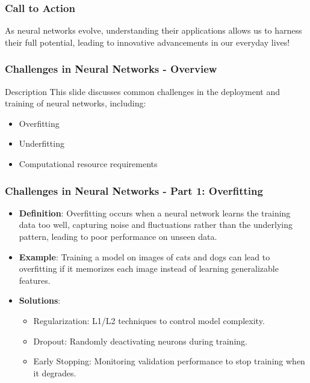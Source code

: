 \documentclass[aspectratio=169]{beamer}
\begin{document}
\begin{frame}[fragile]
    \frametitle{Call to Action}
    As neural networks evolve, understanding their applications allows us to harness their full potential, leading to innovative advancements in our everyday lives!
\end{frame}

\begin{frame}[fragile]
  \frametitle{Challenges in Neural Networks - Overview}
  
  \begin{block}{Description}
    This slide discusses common challenges in the deployment and training of neural networks, including:
    \begin{itemize}
      \item Overfitting
      \item Underfitting
      \item Computational resource requirements
    \end{itemize}
  \end{block}
\end{frame}

\begin{frame}[fragile]
  \frametitle{Challenges in Neural Networks - Part 1: Overfitting}

  \begin{itemize}
    \item \textbf{Definition}: 
      Overfitting occurs when a neural network learns the training data too well, capturing noise and fluctuations rather than the underlying pattern, leading to poor performance on unseen data.
      
    \item \textbf{Example}: 
      Training a model on images of cats and dogs can lead to overfitting if it memorizes each image instead of learning generalizable features.
      
    \item \textbf{Solutions}:
      \begin{itemize}
        \item Regularization: L1/L2 techniques to control model complexity.
        \item Dropout: Randomly deactivating neurons during training.
        \item Early Stopping: Monitoring validation performance to stop training when it degrades.
      \end{itemize}
  \end{itemize}
\end{frame}
\end{document}
